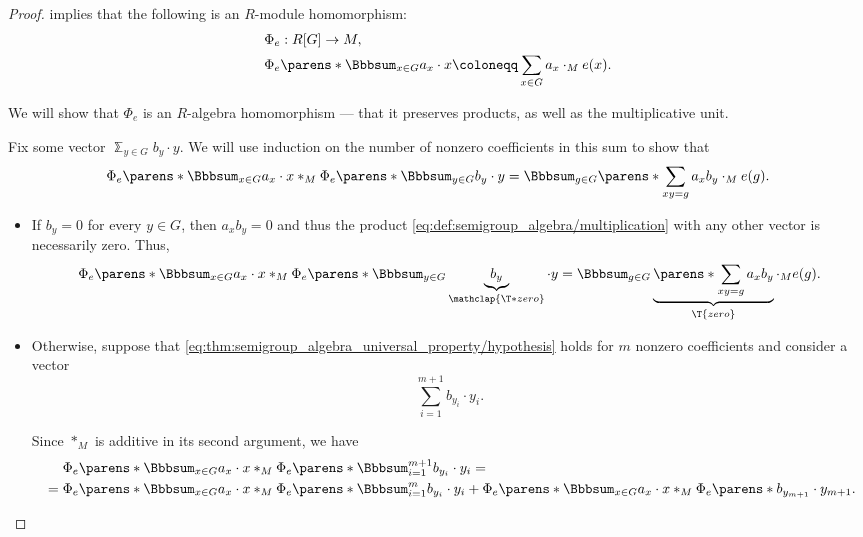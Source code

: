 \begin{proof}
   implies that the following is an \( R \)-module homomorphism:
  \begin{equation*}
    \begin{aligned}
      &\Phi_e: R[G] \to M, \\
      &\Phi_e\parens*{ \Bbbsum_{x \in G} a_x \cdot x } \coloneqq \sum_{x \in G} a_x \cdot_M e(x).
    \end{aligned}
  \end{equation*}

  We will show that \( \Phi_e \) is an \( R \)-algebra homomorphism --- that it preserves products, as well as the multiplicative unit.

  Fix some vector \( \Bbbsum_{y \in G} b_y \cdot y \). We will use induction on the number of nonzero coefficients in this sum to show that
  \begin{equation}\label{eq:thm:semigroup_algebra_universal_property/hypothesis}
    \Phi_e\parens*{ \Bbbsum_{x \in G} a_x \cdot x } \ast_M \Phi_e\parens*{ \Bbbsum_{y \in G} b_y \cdot y }
    =
    \Bbbsum_{g \in G} \parens*{ \sum_{x y = g} a_x b_y } \cdot_M e(g).
  \end{equation}

  \begin{itemize}
    \item If \( b_y = 0 \) for every \( y \in G \), then \( a_x b_y = 0 \) and thus the product \eqref{eq:def:semigroup_algebra/multiplication} with any other vector is necessarily zero. Thus,
    \begin{equation*}
      \Phi_e\parens*{ \Bbbsum_{x \in G} a_x \cdot x } \ast_M \Phi_e\parens*{ \Bbbsum_{y \in G} \underbrace{b_y}_{\mathclap{\T*{zero}}} \cdot y }
      =
      \Bbbsum_{g \in G} \underbrace{\parens*{ \sum_{x y = g} a_x b_y }}_{\T{zero}} \cdot_M e(g).
    \end{equation*}

    \item Otherwise, suppose that \eqref{eq:thm:semigroup_algebra_universal_property/hypothesis} holds for \( m \) nonzero coefficients and consider a vector
    \begin{equation*}
      \sum_{i=1}^{m+1} b_{y_i} \cdot y_i.
    \end{equation*}

    Since \( \ast_M \) is additive in its second argument, we have
    \begin{align}
      &\phantom{{}={}}
      \Phi_e\parens*{ \Bbbsum_{x \in G} a_x \cdot x } \ast_M \Phi_e\parens*{ \Bbbsum_{i=1}^{m+1} b_{y_i} \cdot y_i }
      = \nonumber \\ &=
      \Phi_e\parens*{ \Bbbsum_{x \in G} a_x \cdot x } \ast_M \Phi_e\parens*{ \Bbbsum_{i=1}^m b_{y_i} \cdot y_i } + \Phi_e\parens*{ \Bbbsum_{x \in G} a_x \cdot x } \ast_M \Phi_e\parens*{ b_{y_{m+1}} \cdot y_{m+1} }. \label{eq:thm:semigroup_algebra_universal_property/split}
    \end{align}


\end{itemize}
\end{proof}
